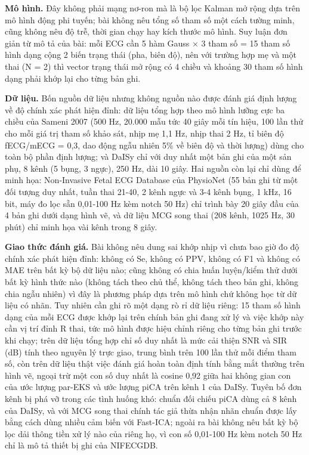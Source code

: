 \documentclass[12pt,a4paper]{article}
\begin{document}
\noindent \textbf{Mô hình.} Đây không phải mạng nơ-ron mà là bộ lọc Kalman mở rộng dựa trên mô hình động phi tuyến; bài không nêu tổng số tham số một cách tường minh, cũng không nêu độ trễ, thời gian chạy hay kích thước mô hình. Suy luận đơn giản từ mô tả của bài: mỗi ECG cần 5 hàm Gauss × 3 tham số = 15 tham số hình dạng cộng 2 biến trạng thái (pha, biên độ), nên với trường hợp mẹ và một thai (N = 2) thì vector trạng thái mở rộng có 4 chiều và khoảng 30 tham số hình dạng phải khớp lại cho từng bản ghi.\par\vspace{3pt}
\noindent \textbf{Dữ liệu.} Bốn nguồn dữ liệu nhưng không nguồn nào được đánh giá định lượng về độ chính xác phát hiện đỉnh: dữ liệu tổng hợp theo mô hình lưỡng cực ba chiều của Sameni 2007 (500 Hz, 20.000 mẫu tức 40 giây mỗi tín hiệu, 100 lần thử cho mỗi giá trị tham số khảo sát, nhịp mẹ 1,1 Hz, nhịp thai 2 Hz, tỉ biên độ fECG/mECG = 0,3, dao động ngẫu nhiên 5\% về biên độ và thời lượng) dùng cho toàn bộ phần định lượng; và DaISy chỉ với duy nhất một bản ghi của một sản phụ, 8 kênh (5 bụng, 3 ngực), 250 Hz, dài 10 giây. Hai nguồn còn lại chỉ dùng để minh họa: Non-Invasive Fetal ECG Database của PhysioNet (55 bản ghi từ một đối tượng duy nhất, tuần thai 21-40, 2 kênh ngực và 3-4 kênh bụng, 1 kHz, 16 bit, máy đo lọc sẵn 0,01-100 Hz kèm notch 50 Hz) chỉ trình bày 20 giây đầu của 4 bản ghi dưới dạng hình vẽ, và dữ liệu MCG song thai (208 kênh, 1025 Hz, 30 phút) chỉ minh họa vài kênh trong 8 giây.\par\vspace{3pt}
\noindent \textbf{Giao thức đánh giá.} Bài không nêu dung sai khớp nhịp vì chưa bao giờ đo độ chính xác phát hiện đỉnh: không có Se, không có PPV, không có F1 và không có MAE trên bất kỳ bộ dữ liệu nào; cũng không có chia huấn luyện/kiểm thử dưới bất kỳ hình thức nào (không tách theo chủ thể, không tách theo bản ghi, không chia ngẫu nhiên) vì đây là phương pháp dựa trên mô hình chứ không học từ dữ liệu có nhãn. Tuy nhiên cần ghi rõ một dạng rò rỉ dữ liệu riêng: 15 tham số hình dạng của mỗi ECG được khớp lại trên chính bản ghi đang xử lý và việc khớp này cần vị trí đỉnh R thai, tức mô hình được hiệu chỉnh riêng cho từng bản ghi trước khi chạy; trên dữ liệu tổng hợp chỉ số duy nhất là mức cải thiện SNR và SIR (dB) tính theo nguyên lý trực giao, trung bình trên 100 lần thử mỗi điểm tham số, còn trên dữ liệu thật việc đánh giá hoàn toàn định tính bằng mắt thường trên hình vẽ, ngoại trừ một con số duy nhất là cosine 0,92 giữa hai không gian con của ước lượng par-EKS và ước lượng piCA trên kênh 1 của DaISy. Tuyên bố đơn kênh bị phá vỡ trong các tình huống khó: chuẩn đối chiếu piCA dùng cả 8 kênh của DaISy, và với MCG song thai chính tác giả thừa nhận nhãn chuẩn được lấy bằng cách dùng nhiều cảm biến với Fast-ICA; ngoài ra bài không nêu bất kỳ bộ lọc dải thông tiền xử lý nào của riêng họ, vì con số 0,01-100 Hz kèm notch 50 Hz chỉ là mô tả thiết bị ghi của NIFECGDB.\par\vspace{3pt}
\end{document}
